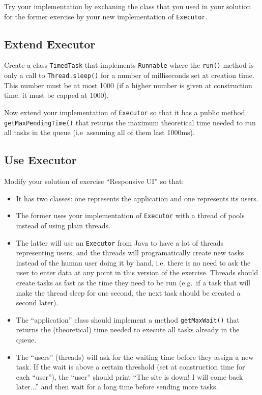 \documentclass{article}
\begin{document}
Try your implementation by exchaning the class that you used in your
solution for the former exercise by your new implementation of
\verb+Executor+. 

\subsection{Extend Executor}
\label{sec:extending-executor}

Create a class \verb+TimedTask+ that implements
\verb+Runnable+ where the \verb+run()+ method is only a call to
\verb+Thread.sleep()+ for a number of milliseconds set at creation
time. This number must be at most 1000 (if a higher number is given at
construction time, it must be capped at 1000). 

Now extend your implementation of \verb+Executor+ so that it has a
public method \verb+getMaxPendingTime()+ that returns the maximum
theoretical time needed to run all tasks in the queue (i.e~assuming
all of them last 1000ms).


\subsection{Use Executor}
\label{sec:use-new-executor}

Modify your solution of exercise ``Responsive UI'' so that: 

\begin{itemize}
\item It has two classes: one represents the application and one
  represents its users.
\item The former uses your implementation of \verb+Executor+ with a
  thread of pools instead of using plain threads.
\item The latter will use an \verb+Executor+ from Java 
  to have a lot of
  threads representing users, and the threads will programatically
  create new tasks instead of the human user doing it by hand,
  i.e. there is no need to ask the user to enter data at any point in
  this version of the exercise. Threads should create tasks as
  fast as the time they need to be run (e.g.~if a task that will make
  the thread sleep for one second, the next task should be created
  a second later). 
\item The ``application'' class should implement a method
  \verb+getMaxWait()+ that returns the (theoretical) time needed to
  execute all tasks already in the queue.
\item The ``users'' (threads) will ask for the waiting time
  before they assign a new task. If the wait is above a certain
  threshold (set at construction time for each ``user''), the ``user'' 
  should print ``The site is down! I will come back later...'' and
  then wait for a long time before sending 
  more tasks. 
\end{itemize}
\end{document}
